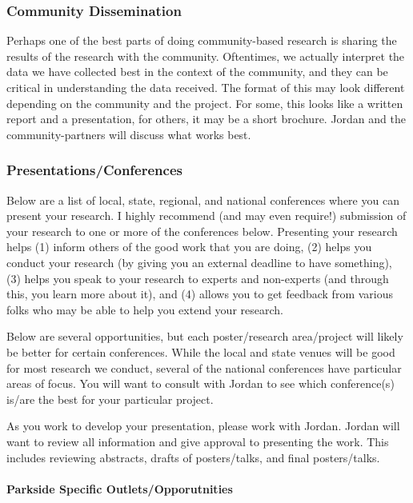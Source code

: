 \documentclass[
]{book}
\begin{document}
\hypertarget{community}{%
\subsubsection{Community Dissemination}\label{community}}

Perhaps one of the best parts of doing community-based research is sharing the results of the research with the community. Oftentimes, we actually interpret the data we have collected best in the context of the community, and they can be critical in understanding the data received. The format of this may look different depending on the community and the project. For some, this looks like a written report and a presentation, for others, it may be a short brochure. Jordan and the community-partners will discuss what works best.

\hypertarget{presentations}{%
\subsubsection{Presentations/Conferences}\label{presentations}}

Below are a list of local, state, regional, and national conferences where you can present your research. I highly recommend (and may even require!) submission of your research to one or more of the conferences below. Presenting your research helps (1) inform others of the good work that you are doing, (2) helps you conduct your research (by giving you an external deadline to have something), (3) helps you speak to your research to experts and non-experts (and through this, you learn more about it), and (4) allows you to get feedback from various folks who may be able to help you extend your research.

Below are several opportunities, but each poster/research area/project will likely be better for certain conferences. While the local and state venues will be good for most research we conduct, several of the national conferences have particular areas of focus. You will want to consult with Jordan to see which conference(s) is/are the best for your particular project.

As you work to develop your presentation, please work with Jordan. Jordan will want to review all information and give approval to presenting the work. This includes reviewing abstracts, drafts of posters/talks, and final posters/talks.

\hypertarget{parkside-specific-outletsopporutnities}{%
\paragraph{Parkside Specific Outlets/Opporutnities}\label{parkside-specific-outletsopporutnities}}
\end{document}
